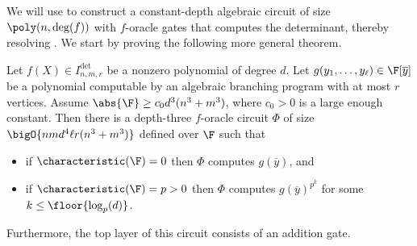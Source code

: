\documentclass[letterpaper, 11pt]{amsart}
\begin{document}
We will use  to construct a constant-depth algebraic circuit of size $\poly(n,\deg(f))$ with $f$-oracle gates that computes the determinant, thereby resolving . We start by proving the following more general theorem.
\begin{thrm}\label{thrm:ABP_det_oracle}
    Let $f(X) \in I^{\det}_{n, m, r}$ be a nonzero polynomial of degree $d$.
    Let $g(y_1, \ldots, y_\ell) \in \F[\overline{y}]$ be a polynomial computable by an algebraic branching program with at most $r$ vertices.
    Assume $\abs{\F} \geq c_0 d^3(n^3+m^3)$, where $c_0>0$ is a large enough constant.
    Then there is a depth-three $f$-oracle circuit $\Phi$ of size $\bigO{nmd^4\ell r(n^3+m^3)}$ defined over $\F$ such that 
    \begin{itemize}
        \item if $\characteristic(\F) = 0$ then $\Phi$ computes $g(\overline{y})$, and
        \item if $\characteristic(\F) = p > 0$ then $\Phi$ computes $g(\overline{y})^{p^k}$ for some $k \leq \floor{\log_p(d)}$.
    \end{itemize}
    Furthermore, the top layer of this circuit consists of an addition gate.
\end{thrm}
\end{document}
